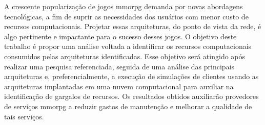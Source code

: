 A crescente popularização de jogos \acf{mmorpg} demanda por novas abordagens tecnológicas, a fim de suprir as necessidades dos usuários com menor custo de recursos computacionais.
%
Projetar essas arquiteturas, do ponto de vista da rede, é algo pertinente e impactante para o sucesso desses jogos.
%
O objetivo deste trabalho é propor uma análise voltada a identificar os recursos computacionais consumidos pelas arquiteturas identificadas.
%
Esse objetivo será atingido após realizar uma pesquisa referenciada, seguida de uma análise das principais arquiteturas e, preferencialmente, a execução de simulações de clientes usando as arquiteturas implantadas em uma nuvem computacional para auxiliar na identificação de gargalos de recursos. 
%
Os resultados obtidos auxiliarão provedores de serviços \ac{mmorpg} a reduzir gastos de manutenção e melhorar a qualidade de tais serviços.
